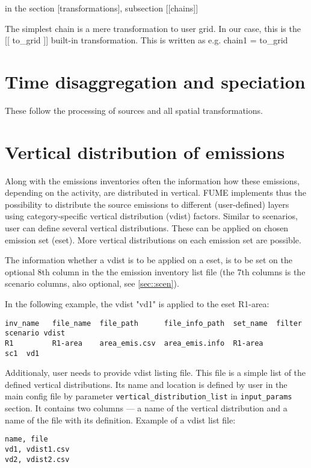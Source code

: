 \documentclass[a4paper,11pt]{article}
\begin{document}
in the section {[}transformations{]}, subsection {[}{[}chains{]}{]}

The simplest chain is a mere transformation to user grid. In our case,
this is the {[}{[} to\_grid {]}{]} built-in transformation. This is
written as e.g. chain1 = to\_grid

\section{Time disaggregation and speciation}\label{time-disaggregation-and-speciation}

These follow the processing of sources and all spatial transformations.

\section{Vertical distribution of emissions}\label{sec:vdist}

Along with the emissions inventories often the information how these emissions, 
depending on the activity, are distributed in vertical. FUME implements thus the possibility
to distribute the source emissions to different (user-defined) layers using category-specific
 vertical distribution (vdist) factors. Similar to scenarios, user can define several vertical distributions. These can be applied on chosen emission set (eset). More vertical distributions on each emission set are possible.

The information whether a vdist is to be applied on a eset, is to be set on the optional 8th column in the the emission inventory list file (the 7th columns is the scenario columns, also optional, see \ref{sec::scen}).

In the following example, the vdist "vd1" is applied to the eset R1-area:

\begin{verbatim}
inv_name   file_name  file_path      file_info_path  set_name  filter  scenario	vdist
R1         R1-area    area_emis.csv  area_emis.info  R1-area           sc1	vd1
\end{verbatim}

Additionaly, user needs to provide vdist listing file. This file is a simple list of the defined vertical distributions. Its name and location is defined by user in the main config file by parameter \verb|vertical_distribution_list| in \verb|input_params| section. It contains two columns --- a name of the vertical distribution and a name of the file with its definition. Example of a vdist list file:
\begin{verbatim}
name, file
vd1, vdist1.csv
vd2, vdist2.csv
\end{verbatim}
\end{document}
